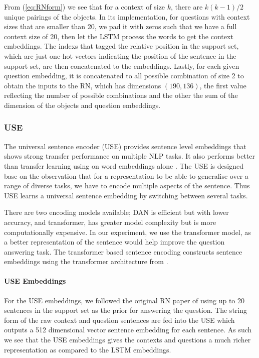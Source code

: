 \documentclass{article}
\begin{document}
From (\ref{eq:RNform}) we see that for a context of size $k$, there are $k(k-1)/2$ unique pairings of the objects. In its implementation, for questions with context sizes that are smaller than 20, we pad it with zeros such that we have a full context size of 20, then let the LSTM process the words to get the context embeddings. The indexs that tagged the relative position in the support set, which are just one-hot vectors indicating the position of the sentence in the support set, are then concatenated to the embeddings. Lastly, for each given question embedding, it is concatenated to all possible combination of size 2 to obtain the inputs to the RN, which has dimensions $(190, 136)$, the first value reflecting the number of possible combinations and the other the sum of the dimension of the objects and question embeddings.

\subsubsection{USE}
The universal sentence encoder (USE) provides sentence level embeddings that shows strong transfer performance on multiple NLP tasks. It also performs better than transfer learning using on word embeddings alone \cite{Cer2018}. The USE is designed base on the observation that for a representation to be able to generalise over a range of diverse tasks, we have to encode multiple aspects of the sentence. Thus USE learns a universal sentence embedding by switching between several tasks. 

There are two encoding models available; DAN is efficient but with lower accuracy, and transformer, has greater model complexity but is more computationally expensive. In our experiment, we use the transformer model, as a better representation of the sentence would help improve the question answering task. The transformer based sentence encoding constructs sentence embeddings using the transformer architecture from \cite{NIPS2017_7181}.

\paragraph{USE Embeddings}

For the USE embeddings, we followed the original RN paper of using up to 20 sentences in the support set as the prior for answering the question. The string form of the raw context and question sentences are fed into the USE which outputs a 512 dimensional vector sentence embedding for each sentence. As such we see that the USE embeddings gives the contexts and questions a much richer representation as compared to the LSTM embeddings.
\end{document}

